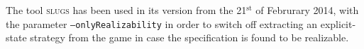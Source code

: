 \documentclass[a4paper,conference,10pt]{IEEEtran}
\begin{document}
The tool \textsc{slugs} has been used in its version from the 21$^\mathrm{st}$ of Februrary 2014, with the parameter \texttt{--onlyRealizability} in order to switch off extracting an explicit-state strategy from the game in case the specification is found to be realizable.



\end{document}
